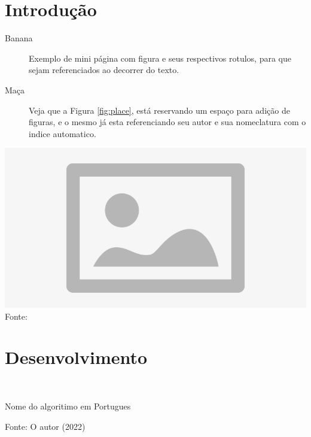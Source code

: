 
\section{Introdução}

\noindent \begin{minipage}[c]{0.6\textwidth}
  \vspace {1cm}
  \begin{description}
    \item [Banana] Exemplo de mini página com figura e seus respectivos rotulos, para que sejam referenciados ao decorrer do texto.
    \item [Maça] Veja que a Figura \ref{fig:place}, está reservando um espaço para adição de figuras, e o mesmo já esta referenciando seu autor e sua nomeclatura com o indice automatico.
  \end{description}

\end{minipage}
\begin{minipage}[c]{0.4\textwidth}
  \includegraphics[width=\textwidth]{figure/placeholder.jpg}
  \label{fig:place}
  {\fontsize{10pt}{\baselineskip}\selectfont
    Fonte: }
\end{minipage}


\section{Desenvolvimento}

\begin{algorithm}[H]
  \SetAlgoLined %
   \
    \
   \caption{Nome do algoritimo em Portugues}
   {\fontsize{10pt}{\baselineskip}\selectfont
   Fonte: O autor (2022)}

\end{algorithm}
